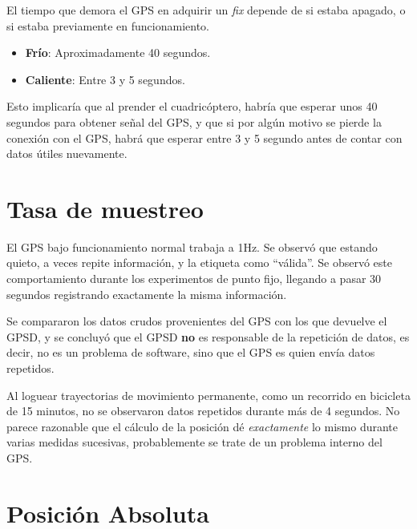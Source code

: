 \documentclass[main]{subfiles}
\begin{document}
El tiempo que demora el GPS en adquirir un \textit{fix} depende de si estaba apagado, o si estaba previamente en funcionamiento.
\begin{itemize}
\item \textbf{Frío}: Aproximadamente 40 segundos.
\item \textbf{Caliente}: Entre 3 y 5 segundos.
\end{itemize}

Esto implicaría que al prender el cuadricóptero, habría que esperar unos 40 segundos para obtener se\~nal del GPS, y que si por algún motivo se pierde la conexión con el GPS, habrá que esperar entre 3 y 5 segundo antes de contar con datos útiles nuevamente.

\section{Tasa de muestreo}
\label{sec:tasa-de-muestreo}

El GPS bajo funcionamiento normal trabaja a 1Hz. Se observó que estando quieto, a veces repite información, y la etiqueta como ``válida''. Se observó este comportamiento durante los experimentos de punto fijo, llegando a pasar 30 segundos registrando exactamente la misma información.

Se compararon los datos crudos provenientes del GPS con los que devuelve el GPSD, y se concluyó que el GPSD \textbf{no} es responsable de la repetición de datos, es decir, no es un problema de software, sino que el GPS es quien env\'ia datos repetidos.

Al loguear trayectorias de movimiento permanente, como un recorrido en bicicleta de 15 minutos, no se observaron  datos repetidos durante más de 4 segundos. No parece razonable que el cálculo de la posición dé \textit{exactamente} lo mismo durante varias medidas sucesivas, probablemente se trate de un problema interno del GPS.

\section{Posición Absoluta}
\label{sec:posicion-absoluta}
\end{document}
